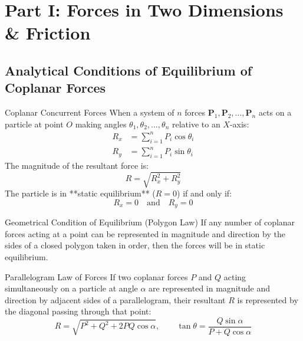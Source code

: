 \documentclass[11pt,a4paper]{article}
\begin{document}
\newpage
\tableofcontents
\newpage

\section{Part I: Forces in Two Dimensions \& Friction}

\subsection{Analytical Conditions of Equilibrium of Coplanar Forces}

\begin{definitionbox}{Coplanar Concurrent Forces}
When a system of $n$ forces $\mathbf{P}_1, \mathbf{P}_2, \dots, \mathbf{P}_n$ acts on a particle at point $O$ making angles $\theta_1, \theta_2, \dots, \theta_n$ relative to an $X$-axis:
\begin{align}
R_x &= \sum_{i=1}^n P_i \cos\theta_i \\
R_y &= \sum_{i=1}^n P_i \sin\theta_i
\end{align}
The magnitude of the resultant force is:
\begin{equation}
R = \sqrt{R_x^2 + R_y^2}
\end{equation}
The particle is in **static equilibrium** ($R = 0$) if and only if:
\begin{equation}
R_x = 0 \quad \text{and} \quad R_y = 0
\end{equation}
\end{definitionbox}

\begin{theorembox}{Geometrical Condition of Equilibrium (Polygon Law)}
If any number of coplanar forces acting at a point can be represented in magnitude and direction by the sides of a closed polygon taken in order, then the forces will be in static equilibrium.
\end{theorembox}

\begin{theorembox}{Parallelogram Law of Forces}
If two coplanar forces $P$ and $Q$ acting simultaneously on a particle at angle $\alpha$ are represented in magnitude and direction by adjacent sides of a parallelogram, their resultant $R$ is represented by the diagonal passing through that point:
\begin{equation}
R = \sqrt{P^2 + Q^2 + 2PQ\cos\alpha}, \qquad \tan\theta = \frac{Q\sin\alpha}{P + Q\cos\alpha}
\end{equation}
\end{theorembox}
\end{document}
